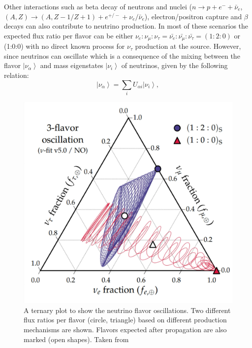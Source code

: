 Other interactions such as beta decay of neutrons and nuclei ($n \longrightarrow p + e^- + \bar{\nu}_{e} $, $(A, Z) \longrightarrow (A, Z-1/ Z+1) + e^{+/-} + \nu_{e} / \bar{\nu}_{e}$), electron/positron capture and $\beta$ decays can also contribute to neutrino production. In most of these scenarios the expected flux ratio per flavor can be either $ \nu_{e} : \nu_{\mu} : \nu_{\tau} = \bar{\nu_{e}}: \bar{\nu_{\mu}}: \bar{\nu_{\tau}} = (1:2:0) $ or (1:0:0) with no direct known process for $\nu_{\tau}$ production at the source. However, since neutrinos can oscillate which is a consequence of the mixing between the flavor  $\left| \nu_{\alpha} \right\rangle $ and mass eigenstates $\left| \nu_{i} \right\rangle $  of neutrinos, given by the following relation:
\begin{equation}
\left| \nu_{\alpha} \right\rangle  = \sum_i U_{\alpha i} \left| \nu_{i} \right\rangle,
\end{equation}
\begin{figure}[t!]
  \centering
  \includegraphics[width=12.5cm]{thesis_figures/CRnNu/Oscillation_sim_ternary.pdf}
  \caption{A ternary plot to show the neutrino flavor oscillations. Two different flux ratios per flavor (circle, triangle) based on different production mechanisms are shown. Flavors expected after propagation are also marked (open shapes). Taken from~\cite{Ahlers:ISAPP2022}}
  \label{fig:Oscillation_ternary}
\end{figure}


